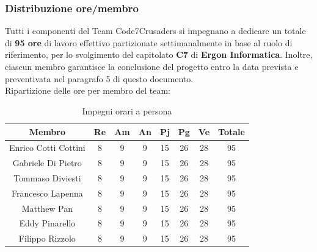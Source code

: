 \documentclass{article}
\begin{document}
        \subsubsection{Distribuzione ore/membro}
        Tutti i componenti del Team Code7Crusaders si impegnano a dedicare un totale di \textbf{95 ore} di lavoro effettivo partizionate
        settimanalmente in base al ruolo di riferimento, per lo svolgimento del capitolato \textbf{C7} di \textbf{Ergon Informatica}. Inoltre,
        ciascun membro garantisce la conclusione del progetto entro la data prevista e preventivata nel paragrafo 5 di questo documento.
        \\
        Ripartizione delle ore per membro del team:
        \begin{table}[!h]
            \begin{center}
                \begin{tabular}{ |c|c|c|c|c|c|c|c| }
                    \hline
                    \textbf{Membro}    & \textbf{Re} & \textbf{Am} & \textbf{An} & \textbf{Pj} & \textbf{Pg} & \textbf{Ve} & \textbf{Totale} \\
                    \hline
                    Enrico Cotti Cottini     & 8           & 9           & 9          & 15          & 26          & 28          & 95              \\
                    Gabriele Di Pietro       & 8           & 9           & 9          & 15          & 26          & 28          & 95              \\
                    Tommaso Diviesti         & 8           & 9           & 9          & 15          & 26          & 28          & 95              \\
                    Francesco Lapenna        & 8           & 9           & 9          & 15          & 26          & 28          & 95              \\
                    Matthew Pan              & 8           & 9           & 9          & 15          & 26          & 28          & 95              \\
                    Eddy Pinarello           & 8           & 9           & 9          & 15          & 26          & 28          & 95              \\
                    Filippo Rizzolo          & 8           & 9           & 9          & 15          & 26          & 28          & 95              \\
                    \hline
                \end{tabular}
                \caption{Impegni orari a persona}
            \end{center}
        \end{table}
\end{document}
